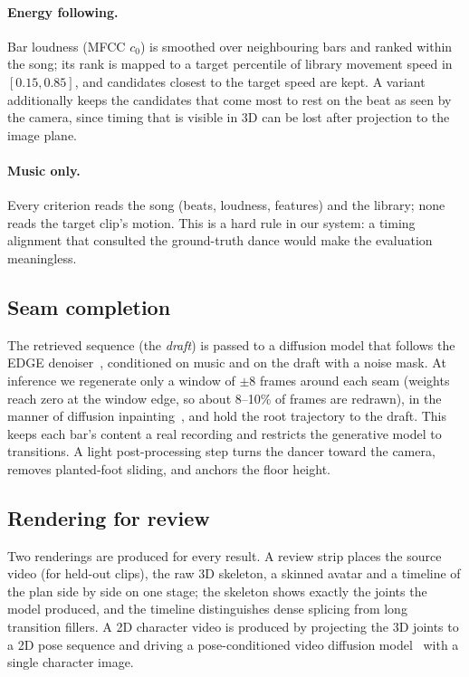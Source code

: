 \documentclass[10pt]{article}
\begin{document}
\paragraph{Energy following.}
Bar loudness (MFCC $c_0$) is smoothed over neighbouring bars and ranked within the song; its rank is mapped to a target percentile of library movement speed in $[0.15, 0.85]$, and candidates closest to the target speed are kept.
A variant additionally keeps the candidates that come most to rest on the beat as seen by the camera, since timing that is visible in 3D can be lost after projection to the image plane.

\paragraph{Music only.}
Every criterion reads the song (beats, loudness, features) and the library; none reads the target clip's motion.
This is a hard rule in our system: a timing alignment that consulted the ground-truth dance would make the evaluation meaningless.

\subsection{Seam completion}
\label{sec:completion}

The retrieved sequence (the \emph{draft}) is passed to a diffusion model that follows the EDGE denoiser~\cite{tseng2023edge}, conditioned on music and on the draft with a noise mask.
At inference we regenerate only a window of $\pm 8$ frames around each seam (weights reach zero at the window edge, so about 8--10\% of frames are redrawn), in the manner of diffusion inpainting~\cite{lugmayr2022repaint}, and hold the root trajectory to the draft.
This keeps each bar's content a real recording and restricts the generative model to transitions.
A light post-processing step turns the dancer toward the camera, removes planted-foot sliding, and anchors the floor height.

\subsection{Rendering for review}
\label{sec:render}

Two renderings are produced for every result.
A review strip places the source video (for held-out clips), the raw 3D skeleton, a skinned avatar and a timeline of the plan side by side on one stage; the skeleton shows exactly the joints the model produced, and the timeline distinguishes dense splicing from long transition fillers.
A 2D character video is produced by projecting the 3D joints to a 2D pose sequence and driving a pose-conditioned video diffusion model~\cite{wan2025} with a single character image.
\end{document}
